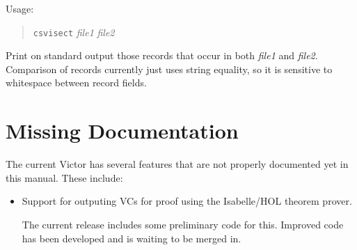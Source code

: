 \documentclass[12pt,fleqn]{article}
\begin{document}
Usage:
\begin{quote}
  \texttt{csvisect} \textit{file1} \textit{file2}
\end{quote}
Print on standard output those records that occur in both
\textit{file1} and \textit{file2}.  Comparison of records currently
just uses string equality, so it is sensitive to whitespace between
record fields. 





\section{Missing Documentation}
The current Victor has several features that are not properly documented
yet in this manual.  These include:
\begin{itemize}
\item Support for outputing VCs for proof using the Isabelle/HOL
  theorem prover.

  The current release includes some preliminary code for this.
  Improved code has been developed and is waiting to be merged in.
\end{itemize}
\end{document}
